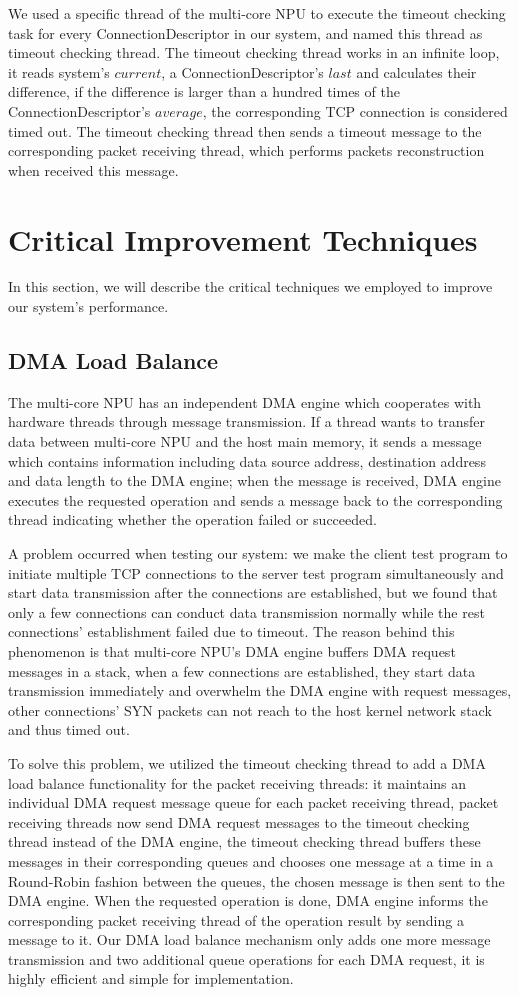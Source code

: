 \documentclass[conference]{IEEEtran}
\begin{document}
We used a specific thread of the multi-core NPU to execute the timeout checking task for every ConnectionDescriptor in our system, and named this thread as timeout checking thread. The timeout checking thread works in an infinite loop, it reads system's $current$, a ConnectionDescriptor's $last$ and calculates their difference, if the difference is larger than a hundred times of the ConnectionDescriptor's $average$, the corresponding TCP connection is considered timed out. The timeout checking thread then sends a timeout message to the corresponding packet receiving thread, which performs packets reconstruction when received this message.
\section{Critical Improvement Techniques}
In this section, we will describe the critical techniques we employed to improve our system's performance.
\subsection{DMA Load Balance}
The multi-core NPU has an independent DMA engine which cooperates with hardware threads through message transmission. If a thread wants to transfer data between multi-core NPU and the host main memory, it sends a message which contains information including data source address, destination address and data length to the DMA engine; when the message is received, DMA engine executes the requested operation and sends a message back to the corresponding thread indicating whether the operation failed or succeeded.

A problem occurred when testing our system: we make the client test program to initiate multiple TCP connections to the server test program simultaneously and start data transmission after the connections are established, but we found that only a few connections can conduct data transmission normally while the rest connections' establishment failed due to timeout. The reason behind this phenomenon is that multi-core NPU's DMA engine buffers DMA request messages in a stack, when a few connections are established, they start data transmission immediately and overwhelm the DMA engine with request messages, other connections' SYN packets can not reach to the host kernel network stack and thus timed out.

To solve this problem, we utilized the timeout checking thread to add a DMA load balance functionality for the packet receiving threads: it maintains an individual DMA request message queue for each packet receiving thread, packet receiving threads now send DMA request messages to the timeout checking thread instead of the DMA engine, the timeout checking thread buffers these messages in their corresponding queues and chooses one message at a time in a Round-Robin fashion between the queues, the chosen message is then sent to the DMA engine. When the requested operation is done, DMA engine informs the corresponding packet receiving thread of the operation result by sending a message to it. Our DMA load balance mechanism only adds one more message transmission and two additional queue operations for each DMA request, it is highly efficient and simple for implementation.
\end{document}
